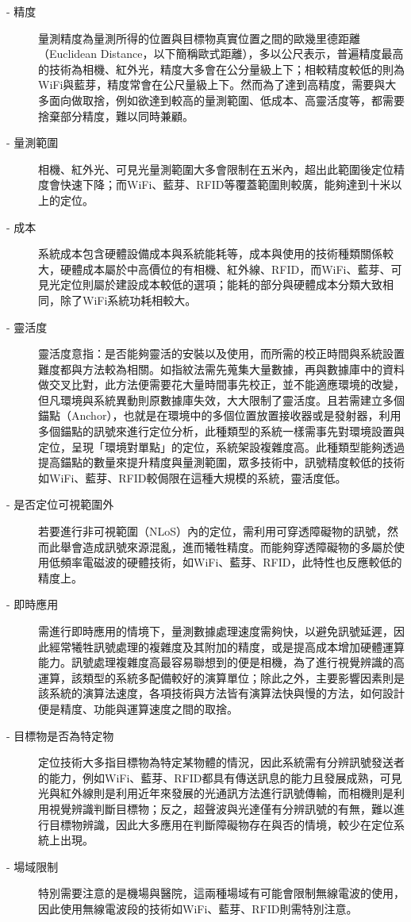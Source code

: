 \begin{description}
    \item[- 精度]
    量測精度為量測所得的位置與目標物真實位置之間的歐幾里德距離（Euclidean Distance，以下簡稱歐式距離），多以公尺表示，普遍精度最高的技術為相機、紅外光，精度大多會在公分量級上下；相較精度較低的則為WiFi與藍芽，精度常會在公尺量級上下。然而為了達到高精度，需要與大多面向做取捨，例如欲達到較高的量測範圍、低成本、高靈活度等，都需要捨棄部分精度，難以同時兼顧。
    \item[- 量測範圍]  
    相機、紅外光、可見光量測範圍大多會限制在五米內，超出此範圍後定位精度會快速下降；而WiFi、藍芽、RFID等覆蓋範圍則較廣，能夠達到十米以上的定位。
    \item[- 成本] 
    系統成本包含硬體設備成本與系統能耗等，成本與使用的技術種類關係較大，硬體成本屬於中高價位的有相機、紅外線、RFID，而WiFi、藍芽、可見光定位則屬於建設成本較低的選項；能耗的部分與硬體成本分類大致相同，除了WiFi系統功耗相較大。
    \item[- 靈活度] 
    靈活度意指：是否能夠靈活的安裝以及使用，而所需的校正時間與系統設置難度都與方法較為相關。如指紋法需先蒐集大量數據，再與數據庫中的資料做交叉比對，此方法便需要花大量時間事先校正，並不能適應環境的改變，但凡環境與系統異動則原數據庫失效，大大限制了靈活度。且若需建立多個錨點（Anchor），也就是在環境中的多個位置放置接收器或是發射器，利用多個錨點的訊號來進行定位分析，此種類型的系統一樣需事先對環境設置與定位，呈現「環境對單點」的定位，系統架設複雜度高。此種類型能夠透過提高錨點的數量來提升精度與量測範圍，眾多技術中，訊號精度較低的技術如WiFi、藍芽、RFID較侷限在這種大規模的系統，靈活度低。
    \item[- 是否定位可視範圍外] 
    若要進行非可視範圍（NLoS）內的定位，需利用可穿透障礙物的訊號，然而此舉會造成訊號來源混亂，進而犧牲精度。而能夠穿透障礙物的多屬於使用低頻率電磁波的硬體技術，如WiFi、藍芽、RFID，此特性也反應較低的精度上。
    \item[- 即時應用] 
    需進行即時應用的情境下，量測數據處理速度需夠快，以避免訊號延遲，因此經常犧牲訊號處理的複雜度及其附加的精度，或是提高成本增加硬體運算能力。訊號處理複雜度高最容易聯想到的便是相機，為了進行視覺辨識的高運算，該類型的系統多配備較好的演算單位；除此之外，主要影響因素則是該系統的演算法速度，各項技術與方法皆有演算法快與慢的方法，如何設計便是精度、功能與運算速度之間的取捨。
    \item[- 目標物是否為特定物] 
    定位技術大多指目標物為特定某物體的情況，因此系統需有分辨訊號發送者的能力，例如WiFi、藍芽、RFID都具有傳送訊息的能力且發展成熟，可見光與紅外線則是利用近年來發展的光通訊方法進行訊號傳輸，而相機則是利用視覺辨識判斷目標物；反之，超聲波與光達僅有分辨訊號的有無，難以進行目標物辨識，因此大多應用在判斷障礙物存在與否的情境，較少在定位系統上出現。
    \item[- 場域限制]
    特別需要注意的是機場與醫院，這兩種場域有可能會限制無線電波的使用，因此使用無線電波段的技術如WiFi、藍芽、RFID則需特別注意。
\end{description}

